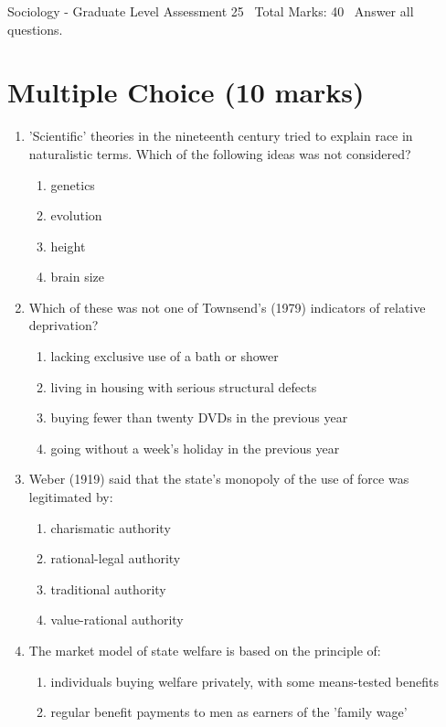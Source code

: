 \documentclass[12pt]{article}
\begin{document}
\begin{center}
Sociology - Graduate Level Assessment 25 \
Total Marks: 40 \
Answer all questions.
\end{center}

\section*{Multiple Choice (10 marks)}
\begin{enumerate}[label=\arabic*.]
\item 'Scientific' theories in the nineteenth century tried to explain race in naturalistic terms. Which of the following ideas was not considered?
\begin{enumerate}[label=(\alph*)]
    \item genetics
    \item evolution
    \item height
    \item brain size
\end{enumerate}
\item Which of these was not one of Townsend's (1979) indicators of relative deprivation?
\begin{enumerate}[label=(\alph*)]
    \item lacking exclusive use of a bath or shower
    \item living in housing with serious structural defects
    \item buying fewer than twenty DVDs in the previous year
    \item going without a week's holiday in the previous year
\end{enumerate}
\item Weber (1919) said that the state's monopoly of the use of force was legitimated by:
\begin{enumerate}[label=(\alph*)]
    \item charismatic authority
    \item rational-legal authority
    \item traditional authority
    \item value-rational authority
\end{enumerate}
\item The market model of state welfare is based on the principle of:
\begin{enumerate}[label=(\alph*)]
    \item individuals buying welfare privately, with some means-tested benefits
    \item regular benefit payments to men as earners of the 'family wage'

\end{enumerate}
\end{enumerate}
\end{document}
